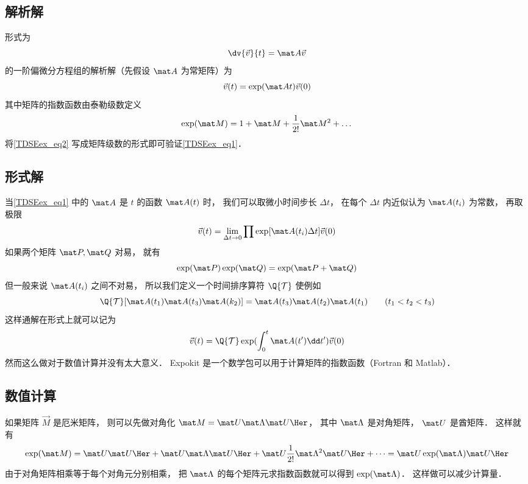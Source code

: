 
\subsection{解析解}
形式为
\begin{equation}\label{TDSEex_eq1}
\dv{\vec v}{t} = \mat A \vec v
\end{equation}
的一阶偏微分方程组的解析解（先假设 $\mat A$ 为常矩阵）为
\begin{equation}\label{TDSEex_eq2}
\vec v(t) = \exp(\mat At) \vec v(0)
\end{equation}
其中矩阵的指数函数由泰勒级数定义
\begin{equation}
\exp(\mat M) = 1 + \mat M + \frac1{2!} \mat M^2 + \dots
\end{equation}
将\autoref{TDSEex_eq2} 写成矩阵级数的形式即可验证\autoref{TDSEex_eq1}．

\subsection{形式解}
当\autoref{TDSEex_eq1} 中的 $\mat A$ 是 $t$ 的函数 $\mat A(t)$ 时， 我们可以取微小时间步长 $\Delta t$， 在每个 $\Delta t$ 内近似认为 $\mat A(t_i)$ 为常数， 再取极限
\begin{equation}
\vec v(t) = \lim_{\Delta t \to 0} \prod \exp[\mat A(t_i)\Delta t] \vec v(0)
\end{equation}
如果两个矩阵 $\mat P, \mat Q$ 对易， 就有
\begin{equation}
\exp(\mat P)\exp(\mat Q) = \exp(\mat P + \mat Q)
\end{equation}
但一般来说 $\mat A(t_i)$ 之间不对易， 所以我们定义一个时间排序算符 $\Q{\mathcal T}$ 使例如
\begin{equation}
\Q {\mathcal T} [\mat A(t_1) \mat A(t_3) \mat A(k_2)] = \mat A(t_3) \mat A(t_2) \mat A(t_1) \qquad ( t_1 < t_2 < t_3 )
\end{equation}
这样通解在形式上就可以记为
\begin{equation}
\vec v(t) = \Q {\mathcal T} \exp(\int_0^ t \mat A(t')\dd t') \vec v(0)
\end{equation}
然而这么做对于数值计算并没有太大意义． Expokit 是一个数学包可以用于计算矩阵的指数函数（Fortran 和 Matlab）．

\subsection{数值计算}
如果矩阵 $\vec M$ 是厄米矩阵， 则可以先做对角化 $\mat M = \mat U \mat \Lambda \mat U\Her$， 其中 $\mat \Lambda$ 是对角矩阵， $\mat U$ 是酋矩阵． 这样就有
\begin{equation}
\exp(\mat M) = \mat U \mat U\Her + \mat U\mat \Lambda\mat U\Her + \mat U\frac1{2!} \mat \Lambda^2 \mat U\Her + \dots = \mat U \exp(\mat \Lambda) \mat U\Her
\end{equation}
由于对角矩阵相乘等于每个对角元分别相乘， 把 $\mat\Lambda$ 的每个矩阵元求指数函数就可以得到 $\exp(\mat \Lambda)$． 这样做可以减少计算量．


